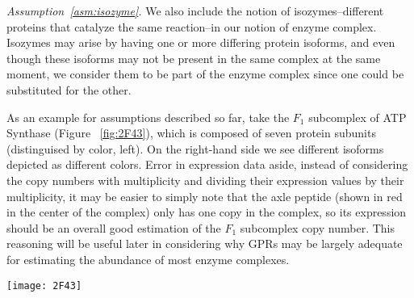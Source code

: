 \emph{Assumption~\ref{asm:isozyme}.} We also include the notion of
isozymes--different proteins that catalyze the same reaction--in our
notion of enzyme complex. Isozymes may arise by having one or more
differing protein isoforms, and even though these isoforms may not be
present in the same complex at the same moment, we consider them to be
part of the enzyme complex since one could be substituted for the
other.

As an example for assumptions described so far, take the $F_1$
subcomplex of ATP Synthase (Figure ~\ref{fig:2F43}), which is composed
of seven protein subunits (distinguised by color, left). On the
right-hand side we see different isoforms depicted as different
colors.  Error in expression data aside, instead of considering the
copy numbers with multiplicity and dividing their expression values by
their multiplicity, it may be easier to simply note that the axle
peptide (shown in red in the center of the complex) only has one copy
in the complex, so its expression should be an overall good estimation
of the $F_1$ subcomplex copy number. This reasoning will be useful
later in considering why GPRs may be largely adequate for estimating
the abundance of most enzyme complexes.

\begin{figure*}%
\label{fig:2F43}
\centering
\texttt{[image: 2F43]}
\caption{Illustration of the $F_1$ part of the ATP Synthase complex
  (PDB ID 1E79; \citealt{Gibbons2000,Bernstein1978,Gezelter}).
  This illustration demonstrates both how an enzyme complex may be
  constituted by multiple subunits (left), and how some of those
  subunits may be products of the same gene and have differing
  stoichiometries within the complex (right).}
\end{figure*}

